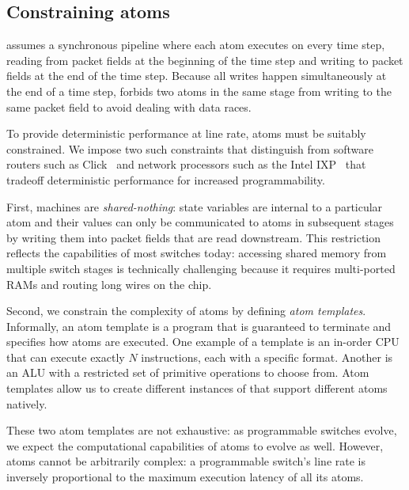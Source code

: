 \subsection{Constraining atoms}
\absmachine assumes a synchronous pipeline where each atom executes on every
time step, reading from packet fields at the beginning of the time step and
writing to packet fields at the end of the time step. Because all writes happen
simultaneously at the end of a time step, \absmachine forbids two atoms in the
same stage from writing to the same packet field to avoid dealing with data
races.

To provide deterministic performance at line rate, atoms must be suitably
constrained.  We impose two such constraints that distinguish \absmachine from
software routers such as Click~\cite{click} and network processors such as the
Intel IXP~\cite{ixp4xx} that tradeoff deterministic performance for
increased programmability.

First, \absmachine machines are \textit{shared-nothing}: state variables are
internal to a particular atom and their values can only be communicated to
atoms in subsequent stages by writing them into packet fields that are read
downstream.  This restriction reflects the capabilities of most switches today:
accessing shared memory from multiple switch stages is technically challenging
because it requires multi-ported RAMs and routing long wires on the chip.

Second, we constrain the complexity of atoms by defining {\it atom templates}.
Informally, an atom template is a program that is guaranteed to terminate and
specifies how atoms are executed. One example of a template is an in-order CPU
that can execute exactly $N$ instructions, each with a specific format. Another
is an ALU with a restricted set of primitive operations to choose from. Atom
templates allow us to create different instances of \absmachine that support
different atoms natively.

These two atom templates are not exhaustive: as programmable switches evolve,
we expect the computational capabilities of atoms to evolve as well. However,
atoms cannot be arbitrarily complex: a programmable switch's line rate is
inversely proportional to the maximum execution latency of all its atoms.
